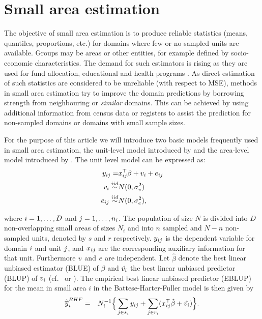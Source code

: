 \documentclass[article]{ajs}
\begin{document}
\section{Small area estimation}
\label{sec:SAE}

The objective of small area estimation is to produce reliable statistics (means, quantiles, proportions, etc.) for domains where few or no sampled units are available. Groups may be areas or other entities, for example defined by socio-economic characteristics. The demand for such estimators is rising as they are used for fund allocation, educational and health programs \citep{pfeffermann13}. As direct estimation of such statistics are considered to be unreliable (with respect to MSE), methods in small area estimation try to improve the domain predictions by borrowing strength from neighbouring or \textit{similar} domains. This can be achieved by using additional information from census data or registers to assist the prediction for non-sampled domains or domains with small sample sizes. 

For the purpose of this article we will introduce two basic models frequently used in small area estimation, the unit-level model introduced by \cite{battese88} and the area-level model introduced by \cite{fay79}. The unit level model \citep{battese88} can be expressed as:
\begin{eqnarray}
	 y_{ij} =& x_{ij}^\top\beta + v_{i} + e_{ij} \nonumber \\
	v_{i} \stackrel{iid}{\sim}& N(0, \sigma_v^2)  \nonumber \\
	e_{ij} \stackrel{iid}{\sim}& N(0, \sigma_e^2) \nonumber,
\end{eqnarray}

where $i = 1, \dots, D$ and $j = 1, \dots, n_i$. The population of size $N$ is divided into $D$ non-overlapping small areas of sizes $N_i$ and into $n$ sampled and $N-n$ non-sampled units, denoted by $s$ and $r$ respectively. $y_{ij}$ is the dependent variable for domain $i$ and unit $j$, and $x_{ij}$ are the corresponding auxiliary information for that unit. Furthermore $v$ and $e$ are independent. Let $\hat{\beta}$ denote the best linear unbiased estimator (BLUE) of $\beta$ and $\hat{v_{i}}$ the best linear unbiased predictor (BLUP) of $v_{i}$ (cf.\ \citealp{Hen50} or \citealp{Sea71}). The empirical best linear unbiased predictor (EBLUP) for the mean in small area $i$ in the Battese-Harter-Fuller model is then given by
\begin{eqnarray}\label{BHFEBLUP}\hat{\overline{y}}_i^{BHF}&=&N_i^{-1}\Big\{\sum_{j\in s_i}y_{ij}+\sum_{j\in r_i}(x_{ij}^\top\hat{{\beta}}+\hat{v_{i}})\Big\}.
\end{eqnarray}
\end{document}
